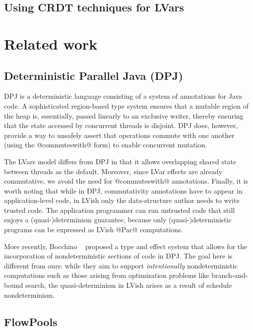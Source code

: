 \documentclass{article}
\begin{document}

\subsection{Using CRDT techniques for LVars}


\section{Related work}\label{s:related}

\subsection{Deterministic Parallel Java (DPJ)}

DPJ \cite{dpj-oopsla, dpj-hotpar09} is a deterministic language
consisting of a system of annotations for Java code.  A sophisticated
region-based type system ensures that a mutable region of the heap is,
essentially, passed linearly to an exclusive writer, thereby ensuring
that the state accessed by concurrent threads is disjoint.  DPJ does,
however, provide a way to unsafely assert that operations commute with
one another (using the @commuteswith@ form) to enable concurrent
mutation.

The LVars model differs from DPJ in that it allows overlapping shared
state between threads as the default.  Moreover, since LVar effects
are already commutative, we avoid the need for @commuteswith@
annotations.  Finally, it is worth noting that while in DPJ,
commutativity annotations have to appear in application-level code, in
LVish only the data-structure author needs to write trusted code. The
application programmer can run untrusted code that still enjoys a
(quasi-)determinism guarantee, because only (quasi-)deterministic
programs can be expressed as LVish @Par@ computations.

More recently, Bocchino \etal~\cite{dpj-popl} proposed a type and
effect system that allows for the incorporation of nondeterministic
sections of code in DPJ.  The goal here is different from ours: while
they aim to support \emph{intentionally} nondeterministic computations
such as those arising from optimization problems like branch-and-bound
search, the quasi-determinism in LVish arises as a result of schedule
nondeterminism.

\subsection{FlowPools}
\end{document}

